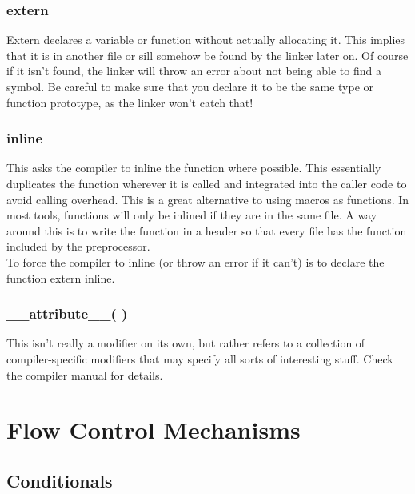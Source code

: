 \documentclass[10pt]{article}
\begin{document}
\subsubsection*{extern}

Extern declares a variable or function without actually allocating it. This implies that it is in another file or sill somehow be found by the linker later on. Of course if it isn’t found, the linker will throw an error about not being able to find a symbol. Be careful to make sure that you declare it to be the same type or function prototype, as the linker won’t catch that! \\

\subsubsection*{inline}\label{sec:inline}

This asks the compiler to inline the function where possible. This essentially duplicates the function wherever it is called and integrated into the caller code to avoid calling overhead. This is a great alternative to using macros as functions. In most tools, functions will only be inlined if they are in the same file. A way around this is to write the function in a header so that every file has the function included by the preprocessor. \\
To force the compiler to inline (or throw an error if it can’t) is to declare the function extern inline.


\subsubsection*{\_\_attribute\_\_( )}

This isn't really a modifier on its own, but rather refers to a collection of compiler-specific modifiers that may specify all sorts of interesting stuff. Check the compiler manual for details.


\section{Flow Control Mechanisms}

\subsection{Conditionals}
\end{document}
